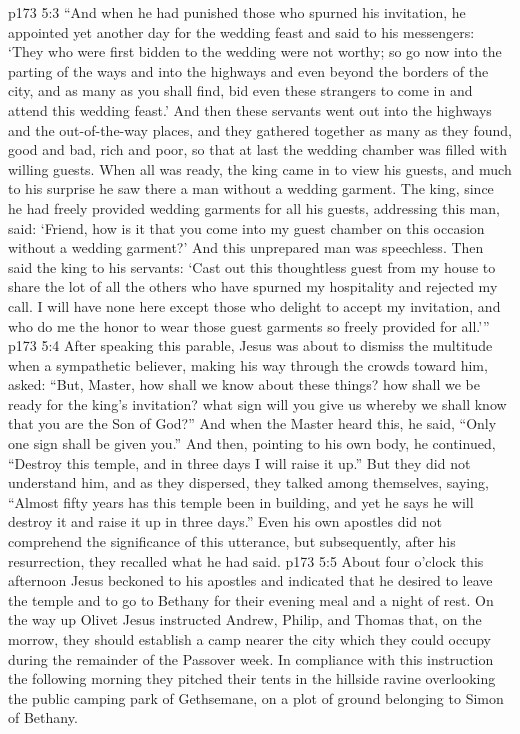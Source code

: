 \vs p173 5:3 \textcolor{ubdarkred}{“And when he had punished those who spurned his invitation, he appointed yet another day for the wedding feast and said to his messengers: ‘They who were first bidden to the wedding were not worthy; so go now into the parting of the ways and into the highways and even beyond the borders of the city, and as many as you shall find, bid even these strangers to come in and attend this wedding feast.’ And then these servants went out into the highways and the out\hyp{}of\hyp{}the\hyp{}way places, and they gathered together as many as they found, good and bad, rich and poor, so that at last the wedding chamber was filled with willing guests. When all was ready, the king came in to view his guests, and much to his surprise he saw there a man without a wedding garment. The king, since he had freely provided wedding garments for all his guests, addressing this man, said: ‘Friend, how is it that you come into my guest chamber on this occasion without a wedding garment?’ And this unprepared man was speechless. Then said the king to his servants: ‘Cast out this thoughtless guest from my house to share the lot of all the others who have spurned my hospitality and rejected my call. I will have none here except those who delight to accept my invitation, and who do me the honor to wear those guest garments so freely provided for all.’”}
\vs p173 5:4 \pc After speaking this parable, Jesus was about to dismiss the multitude when a sympathetic believer, making his way through the crowds toward him, asked: “But, Master, how shall we know about these things? how shall we be ready for the king’s invitation? what sign will you give us whereby we shall know that you are the Son of God?” And when the Master heard this, he said, \textcolor{ubdarkred}{“Only one sign shall be given you.”} And then, pointing to his own body, he continued, \textcolor{ubdarkred}{“Destroy this temple, and in three days I will raise it up.”} But they did not understand him, and as they dispersed, they talked among themselves, saying, “Almost fifty years has this temple been in building, and yet he says he will destroy it and raise it up in three days.” Even his own apostles did not comprehend the significance of this utterance, but subsequently, after his resurrection, they recalled what he had said.
\vs p173 5:5 About four o’clock this afternoon Jesus beckoned to his apostles and indicated that he desired to leave the temple and to go to Bethany for their evening meal and a night of rest. On the way up Olivet Jesus instructed Andrew, Philip, and Thomas that, on the morrow, they should establish a camp nearer the city which they could occupy during the remainder of the Passover week. In compliance with this instruction the following morning they pitched their tents in the hillside ravine overlooking the public camping park of Gethsemane, on a plot of ground belonging to Simon of Bethany.
